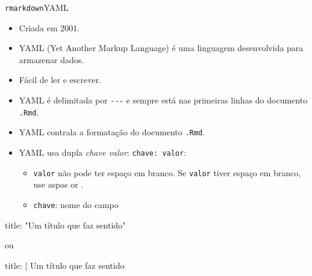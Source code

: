 \documentclass[
  10pt,
  ignorenonframetext,
]{beamer}
\newenvironment{Shaded}{\begin{snugshade}}{\end{snugshade}}
\newcommand{\AttributeTok}[1]{\textcolor[rgb]{0.40,0.45,0.13}{#1}}
\newcommand{\CharTok}[1]{\textcolor[rgb]{0.13,0.47,0.30}{#1}}
\newcommand{\FunctionTok}[1]{\textcolor[rgb]{0.28,0.35,0.67}{#1}}
\newcommand{\KeywordTok}[1]{\textcolor[rgb]{0.00,0.23,0.31}{#1}}
\newcommand{\NormalTok}[1]{\textcolor[rgb]{0.00,0.23,0.31}{#1}}
\newcommand{\StringTok}[1]{\textcolor[rgb]{0.13,0.47,0.30}{#1}}
\providecommand{\tightlist}{%
  \setlength{\itemsep}{0pt}\setlength{\parskip}{0pt}}\usepackage{longtable,booktabs,array}
\begin{document}
\begin{frame}[fragile]{\texttt{rmarkdown}\newline YAML}
\protect\hypertarget{rmarkdownyaml}{}
\small

\begin{itemize}
\tightlist
\item
  Criada em 2001.
\item
  YAML (Yet Another Markup Language) é uma linguagem desenvolvida para
  armazenar dados.
\item
  Fácil de ler e escrever.
\item
  YAML é delimitada por \texttt{-\/-\/-} e sempre está nas primeiras
  linhas do documento \texttt{.Rmd}.
\item
  YAML contrala a formatação do documento \texttt{.Rmd}.
\item
  YAML usa dupla \emph{chave valor}: \texttt{chave:\ valor}:

  \begin{itemize}
  \tightlist
  \item
    \texttt{valor} não pode ter espaço em branco. Se \texttt{valor}
    tiver espaço em branco, use aspas or \texttt{\textbar{}}.
  \item
    \texttt{chave}: nome do campo
  \end{itemize}
\end{itemize}

\begin{Shaded}
\begin{Highlighting}[]
\FunctionTok{title}\KeywordTok{:}\AttributeTok{ }\StringTok{"Um título que faz sentido"}
\end{Highlighting}
\end{Shaded}

ou

\begin{Shaded}
\begin{Highlighting}[]
\FunctionTok{title}\KeywordTok{: }\CharTok{|}
\NormalTok{  Um título que faz sentido}
\end{Highlighting}
\end{Shaded}

\normalsize
\end{frame}
\end{document}

